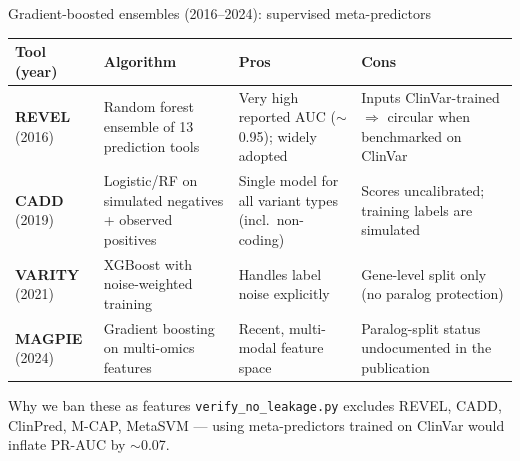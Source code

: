 \documentclass[aspectratio=169,10pt]{beamer}
\begin{document}
\begin{frame}{Gradient-boosted ensembles (2016--2024): supervised meta-predictors}
  \scriptsize
  \begin{tabular}{@{} p{1.5cm} p{2.6cm} p{3cm} p{3cm} @{}}
    \toprule
    \textbf{Tool (year)} & \textbf{Algorithm} & \textbf{\textcolor{green!40!black}{Pros}} & \textbf{\textcolor{red!70!black}{Cons}} \\
    \midrule
    \textbf{REVEL} (2016) &
    Random forest ensemble of 13 prediction tools &
    Very high reported AUC ($\sim$0.95); widely adopted &
    \alert{Inputs ClinVar-trained} $\Rightarrow$ circular when benchmarked on ClinVar \\
    \midrule
    \textbf{CADD} (2019) &
    Logistic/RF on simulated negatives + observed positives &
    Single model for all variant types (incl.\ non-coding) &
    Scores uncalibrated; training labels are simulated \\
    \midrule
    \textbf{VARITY} (2021) &
    XGBoost with noise-weighted training &
    Handles label noise explicitly &
    \alert{Gene-level split only} (no paralog protection) \\
    \midrule
    \textbf{MAGPIE} (2024) &
    Gradient boosting on multi-omics features &
    Recent, multi-modal feature space &
    Paralog-split status undocumented in the publication \\
    \bottomrule
  \end{tabular}

  \vspace{0.4em}
  \begin{exampleblock}{Why we ban these as features}
    \texttt{verify\_no\_leakage.py} excludes REVEL, CADD, ClinPred, M-CAP, MetaSVM ---
    using meta-predictors trained on ClinVar would inflate PR-AUC by $\sim$0.07.
  \end{exampleblock}
\end{frame}
\end{document}
